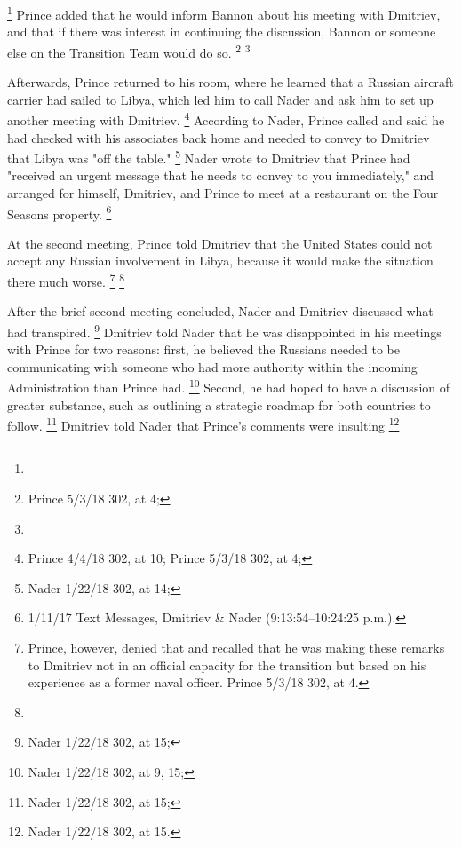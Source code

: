 \footnote{}
Prince added that he would inform Bannon about his meeting with Dmitriev, and that if there was interest in continuing the discussion, Bannon or someone else on the Transition Team would do so.%
\footnote{Prince 5/3/18 302, at 4; }
\footnote{}

Afterwards, Prince returned to his room, where he learned that a Russian aircraft carrier had sailed to Libya, which led him to call Nader and ask him to set up another meeting with Dmitriev.%
\footnote{Prince 4/4/18 302, at 10;
Prince 5/3/18 302, at 4;
}
According to Nader, Prince called and said he had checked with his associates back home and needed to convey to Dmitriev that Libya was "off the table."%
\footnote{Nader 1/22/18 302, at 14;
}
Nader wrote to Dmitriev that Prince had "received an urgent message that he needs to convey to you immediately," and arranged for himself, Dmitriev, and Prince to meet at a restaurant on the Four Seasons property.%
\footnote{ 1/11/17 Text Messages, Dmitriev \& Nader (9:13:54--10:24:25 p.m.).}

At the second meeting, Prince told Dmitriev that the United States could not accept any Russian involvement in Libya, because it would make the situation there much worse.%
\footnote{
Prince, however, denied that and recalled that he was making these remarks to Dmitriev not in an official capacity for the transition but based on his experience as a former naval officer. Prince 5/3/18 302, at 4.}
\footnote{}

After the brief second meeting concluded, Nader and Dmitriev discussed what had transpired.%
\footnote{Nader 1/22/18 302, at 15;
}
Dmitriev told Nader that he was disappointed in his meetings with Prince for two reasons: first, he believed the Russians needed to be communicating with someone who had more authority within the incoming Administration than Prince had.%
\footnote{Nader 1/22/18 302, at 9, 15;
}
Second, he had hoped to have a discussion of greater substance, such as outlining a strategic roadmap for both countries to follow.%
\footnote{Nader 1/22/18 302, at 15;
}
Dmitriev told Nader that
Prince's comments
were insulting
\footnote{ Nader 1/22/18 302, at 15.}

